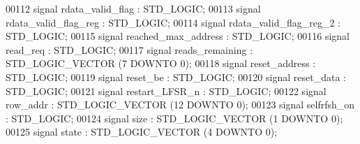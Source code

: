 \begin{DoxyCode}
00112                 \textcolor{keywordflow}{signal} \textcolor{vhdlchar}{rdata_valid_flag} \textcolor{vhdlchar}{:}  \textcolor{comment}{STD\_LOGIC};
00113                 \textcolor{keywordflow}{signal} \textcolor{vhdlchar}{rdata_valid_flag_reg} \textcolor{vhdlchar}{:}  \textcolor{comment}{STD\_LOGIC};
00114                 \textcolor{keywordflow}{signal} \textcolor{vhdlchar}{rdata_valid_flag_reg_2} \textcolor{vhdlchar}{:}  \textcolor{comment}{STD\_LOGIC};
00115                 \textcolor{keywordflow}{signal} \textcolor{vhdlchar}{reached_max_address} \textcolor{vhdlchar}{:}  \textcolor{comment}{STD\_LOGIC};
00116                 \textcolor{keywordflow}{signal} \textcolor{vhdlchar}{read_req} \textcolor{vhdlchar}{:}  \textcolor{comment}{STD\_LOGIC};
00117                 \textcolor{keywordflow}{signal} \textcolor{vhdlchar}{reads_remaining} \textcolor{vhdlchar}{:}  \textcolor{comment}{STD\_LOGIC\_VECTOR} \textcolor{vhdlchar}{(}\textcolor{vhdllogic}{}\textcolor{vhdllogic}{7} \textcolor{keywordflow}{DOWNTO} \textcolor{vhdllogic}{}\textcolor{vhdllogic}{0}\textcolor{vhdlchar}{)};
00118                 \textcolor{keywordflow}{signal} \textcolor{vhdlchar}{reset_address} \textcolor{vhdlchar}{:}  \textcolor{comment}{STD\_LOGIC};
00119                 \textcolor{keywordflow}{signal} \textcolor{vhdlchar}{reset_be} \textcolor{vhdlchar}{:}  \textcolor{comment}{STD\_LOGIC};
00120                 \textcolor{keywordflow}{signal} \textcolor{vhdlchar}{reset_data} \textcolor{vhdlchar}{:}  \textcolor{comment}{STD\_LOGIC};
00121                 \textcolor{keywordflow}{signal} \textcolor{vhdlchar}{restart_LFSR_n} \textcolor{vhdlchar}{:}  \textcolor{comment}{STD\_LOGIC};
00122                 \textcolor{keywordflow}{signal} \textcolor{vhdlchar}{row_addr} \textcolor{vhdlchar}{:}  \textcolor{comment}{STD\_LOGIC\_VECTOR} \textcolor{vhdlchar}{(}\textcolor{vhdllogic}{}\textcolor{vhdllogic}{12} \textcolor{keywordflow}{DOWNTO} \textcolor{vhdllogic}{}\textcolor{vhdllogic}{0}\textcolor{vhdlchar}{)};
00123                 \textcolor{keywordflow}{signal} \textcolor{vhdlchar}{selfrfsh_on} \textcolor{vhdlchar}{:}  \textcolor{comment}{STD\_LOGIC};
00124                 \textcolor{keywordflow}{signal} \textcolor{vhdlchar}{size} \textcolor{vhdlchar}{:}  \textcolor{comment}{STD\_LOGIC\_VECTOR} \textcolor{vhdlchar}{(}\textcolor{vhdllogic}{}\textcolor{vhdllogic}{1} \textcolor{keywordflow}{DOWNTO} \textcolor{vhdllogic}{}\textcolor{vhdllogic}{0}\textcolor{vhdlchar}{)};
00125                 \textcolor{keywordflow}{signal} \textcolor{vhdlchar}{state} \textcolor{vhdlchar}{:}  \textcolor{comment}{STD\_LOGIC\_VECTOR} \textcolor{vhdlchar}{(}\textcolor{vhdllogic}{}\textcolor{vhdllogic}{4} \textcolor{keywordflow}{DOWNTO} \textcolor{vhdllogic}{}\textcolor{vhdllogic}{0}\textcolor{vhdlchar}{)};

\end{DoxyCode}
